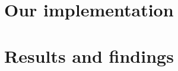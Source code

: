 \documentclass[svgnames]{beamer}
\begin{document}
\section{Our implementation}

\begin{frame}
\end{frame}

\section{Results and findings}

\begin{frame}
\end{frame}
\end{document}
